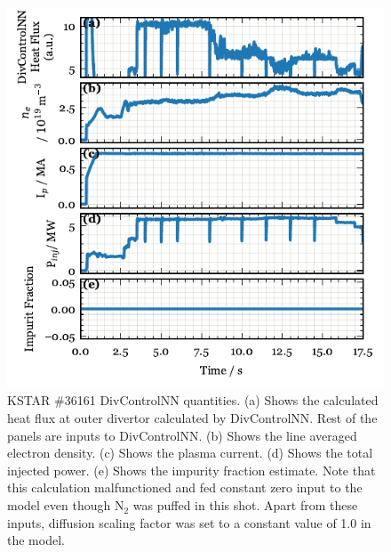 \begin{figure}[!ht]
 \centering
 \includegraphics[width=\linewidth]{figures/SM_inputs_36161.pdf}
 \caption{
KSTAR \#36161 DivControlNN quantities.
(a) Shows the calculated heat flux at outer divertor calculated by DivControlNN.
Rest of the panels are inputs to DivControlNN.
(b) Shows the line averaged electron density.
(c) Shows the plasma current.
(d) Shows the total injected power.
(e) Shows the impurity fraction estimate.
Note that this calculation malfunctioned and fed constant zero input to the model even though N$_2$ was puffed in this shot.
Apart from these inputs, diffusion scaling factor was set to a constant value of 1.0 in the model.
}
 \label{fig:SM_inputs_36161}
\end{figure}